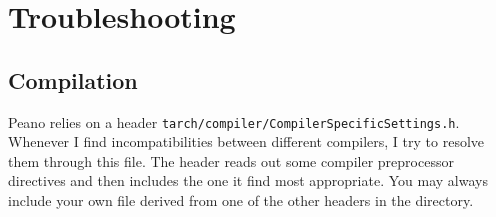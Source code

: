 \chapter{Troubleshooting}

% 





\section{Compilation}

Peano relies on a header \texttt{tarch/compiler/CompilerSpecificSettings.h}.
Whenever I find incompatibilities between different compilers, I try to resolve them through this file. 
The header reads out some compiler preprocessor directives and then includes the
one it find most appropriate. 
You may always include your own file derived from one of the other headers in
the directory.


